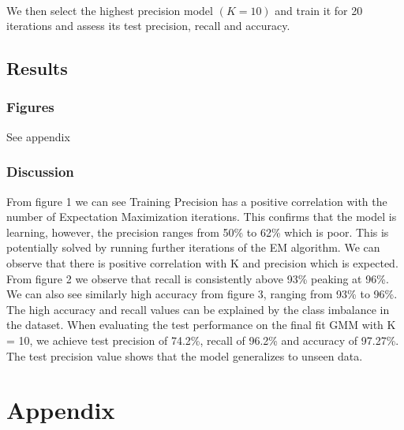 \documentclass[11pt]{article}
\begin{document}
		\paragraph{}We then select the highest precision model $(K = 10)$ and train it for 20 iterations and assess its test precision, recall and accuracy.
		
	\subsection{Results}
	
		\subsubsection{Figures}
		See appendix


	\subsubsection{Discussion}
	
	From figure 1 we can see Training Precision has a positive correlation with the number of Expectation Maximization iterations. This confirms that the model is learning, however, the precision ranges from 50\% to 62\% which is poor. This is potentially solved by running further iterations of the EM algorithm. We can observe that there is positive correlation with K and precision which is expected. From figure 2 we observe that recall is consistently above 93\% peaking at 96\%. We can also see similarly high accuracy from figure 3, ranging from 93\% to 96\%. The high accuracy and recall values can be explained by the class imbalance in the dataset. When evaluating the test performance on the final fit GMM with K = 10, we achieve test precision of 74.2\%, recall of 96.2\% and accuracy of 97.27\%. The test precision value shows that the model generalizes to unseen data. 

\section{Appendix}
\end{document}
